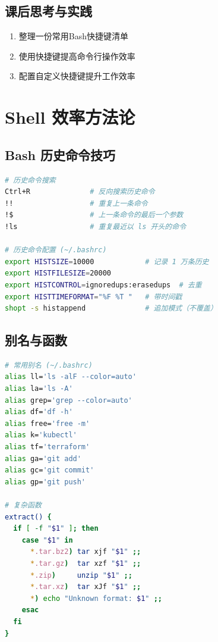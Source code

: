 \documentclass[12pt,UTF8]{ctexbook}
\begin{document}
\subsection*{课后思考与实践}
\label{sec:shortcuts-practice}
\begin{enumerate}
    \item 整理一份常用Bash快捷键清单
    \item 使用快捷键提高命令行操作效率
    \item 配置自定义快捷键提升工作效率
\end{enumerate}

\section{Shell 效率方法论}
\label{sec:shell-efficiency}

\subsection*{Bash 历史命令技巧}

\begin{lstlisting}[language=bash]
# 历史命令搜索
Ctrl+R              # 反向搜索历史命令
!!                  # 重复上一条命令
!$                  # 上一条命令的最后一个参数
!ls                 # 重复最近以 ls 开头的命令

# 历史命令配置 (~/.bashrc)
export HISTSIZE=10000            # 记录 1 万条历史
export HISTFILESIZE=20000
export HISTCONTROL=ignoredups:erasedups  # 去重
export HISTTIMEFORMAT="%F %T "   # 带时间戳
shopt -s histappend              # 追加模式（不覆盖）
\end{lstlisting}

\subsection*{别名与函数}

\begin{lstlisting}[language=bash]
# 常用别名 (~/.bashrc)
alias ll='ls -alF --color=auto'
alias la='ls -A'
alias grep='grep --color=auto'
alias df='df -h'
alias free='free -m'
alias k='kubectl'
alias tf='terraform'
alias ga='git add'
alias gc='git commit'
alias gp='git push'

# 复杂函数
extract() {
  if [ -f "$1" ]; then
    case "$1" in
      *.tar.bz2) tar xjf "$1" ;;
      *.tar.gz)  tar xzf "$1" ;;
      *.zip)     unzip "$1" ;;
      *.tar.xz)  tar xJf "$1" ;;
      *) echo "Unknown format: $1" ;;
    esac
  fi
}
\end{lstlisting}
\end{document}
